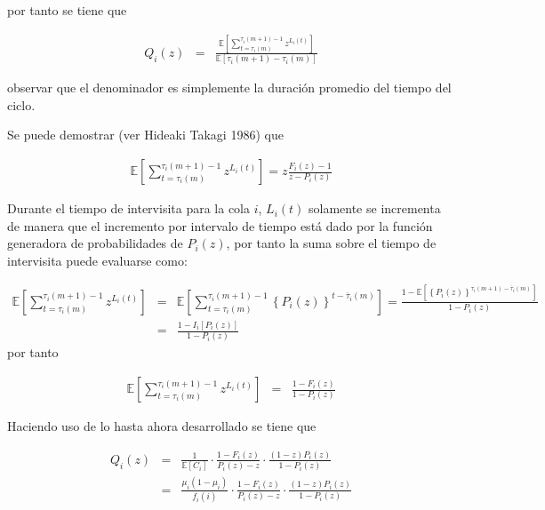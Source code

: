 \documentclass{article}
\newcommand{\esp}{\mathbb{E}}
\numberwithin{equation}{section}
\begin{document}
por tanto se tiene que


\begin{eqnarray*}
Q_{i}\left(z\right)&=&\frac{\esp\left[\sum_{t=\tau_{i}\left(m\right)}^{\tau_{i}\left(m+1\right)-1}z^{L_{i}\left(t\right)}\right]}{\esp\left[\tau_{i}\left(m+1\right)-\tau_{i}\left(m\right)\right]}
\end{eqnarray*}

observar que el denominador es simplemente la duraci\'on promedio del tiempo del ciclo.


Se puede demostrar (ver Hideaki Takagi 1986) que

\begin{eqnarray*}
\esp\left[\sum_{t=\tau_{i}\left(m\right)}^{\tau_{i}\left(m+1\right)-1}z^{L_{i}\left(t\right)}\right]=z\frac{F_{i}\left(z\right)-1}{z-P_{i}\left(z\right)}
\end{eqnarray*}

Durante el tiempo de intervisita para la cola $i$, $L_{i}\left(t\right)$ solamente se incrementa de manera que el incremento por intervalo de tiempo est\'a dado por la funci\'on generadora de probabilidades de $P_{i}\left(z\right)$, por tanto la suma sobre el tiempo de intervisita puede evaluarse como:

\begin{eqnarray*}
\esp\left[\sum_{t=\tau_{i}\left(m\right)}^{\tau_{i}\left(m+1\right)-1}z^{L_{i}\left(t\right)}\right]&=&\esp\left[\sum_{t=\tau_{i}\left(m\right)}^{\tau_{i}\left(m+1\right)-1}\left\{P_{i}\left(z\right)\right\}^{t-\overline{\tau}_{i}\left(m\right)}\right]=\frac{1-\esp\left[\left\{P_{i}\left(z\right)\right\}^{\tau_{i}\left(m+1\right)-\overline{\tau}_{i}\left(m\right)}\right]}{1-P_{i}\left(z\right)}\\
&=&\frac{1-I_{i}\left[P_{i}\left(z\right)\right]}{1-P_{i}\left(z\right)}
\end{eqnarray*}
por tanto

\begin{eqnarray*}
\esp\left[\sum_{t=\tau_{i}\left(m\right)}^{\tau_{i}\left(m+1\right)-1}z^{L_{i}\left(t\right)}\right]&=&\frac{1-F_{i}\left(z\right)}{1-P_{i}\left(z\right)}
\end{eqnarray*}

Haciendo uso de lo hasta ahora desarrollado se tiene que

\begin{eqnarray*}
Q_{i}\left(z\right)&=&\frac{1}{\esp\left[C_{i}\right]}\cdot\frac{1-F_{i}\left(z\right)}{P_{i}\left(z\right)-z}\cdot\frac{\left(1-z\right)P_{i}\left(z\right)}{1-P_{i}\left(z\right)}\\
&=&\frac{\mu_{i}\left(1-\mu_{i}\right)}{f_{i}\left(i\right)}\cdot\frac{1-F_{i}\left(z\right)}{P_{i}\left(z\right)-z}\cdot\frac{\left(1-z\right)P_{i}\left(z\right)}{1-P_{i}\left(z\right)}
\end{eqnarray*}
\end{document}
